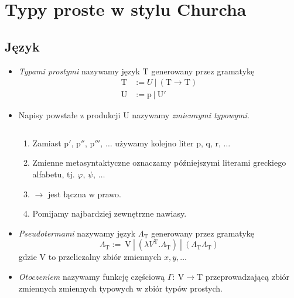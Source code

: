 \section{Typy proste w stylu Churcha}

\subsection{Język}

\begin{definicja}
\begin{itemize}
\item
\emph{Typami prostymi} nazywamy język \(\mathrm{T}\) generowany przez gramatykę
\begin{align*}
  \mathrm{T} &:= U\ |\ (\mathrm{T}\to \mathrm{T})\\
    \mathrm{U} &:= \mathrm{p}\ |\ \mathrm{U}'
\end{align*}

\item Napisy powstałe z produkcji U nazywamy \emph{zmiennymi typowymi}. 

\begin{konwencja*}$ $\newline 
  \begin{enumerate}
    \item Zamiast \(\mathrm{p'},\, \mathrm{p''},\, \mathrm{p'''},\, \dots\) używamy kolejno liter \(\mathrm{p},\, \mathrm{q},\, \mathrm{r},\, \dots\)
    \item Zmienne metasyntaktyczne oznaczamy późniejszymi literami greckiego alfabetu, tj. \(\varphi,\, \psi,\, \dots\)
    \item \(\rightarrow\) jest łączna w prawo.
    \item Pomijamy najbardziej zewnętrzne nawiasy.
  \end{enumerate}
\end{konwencja*}

\item
  \emph{Pseudotermami} nazywamy język \(\Lambda_{\mathrm{T}}\) generowany przez
gramatykę 
\[
  \Lambda_{\mathrm{T}} := \ \mathrm{V}\ | \ \left (\lambda V^{\mathrm{T}} . \Lambda_{\mathrm{T}}\right) \ | \ \left (\Lambda_{\mathrm{T}}\Lambda_{\mathrm{T}}\right)
\]
    gdzie V to przeliczalny zbiór zmiennych \(x, y, \dots\)
  \item \emph{Otoczeniem} nazywamy funkcję częściową \(\Gamma:\:\mathrm{V}\to\mathrm{T}\) przeprowadzającą zbiór zmiennych zmiennych typowych w zbiór typów prostych.
    

\end{itemize}
\end{definicja}
